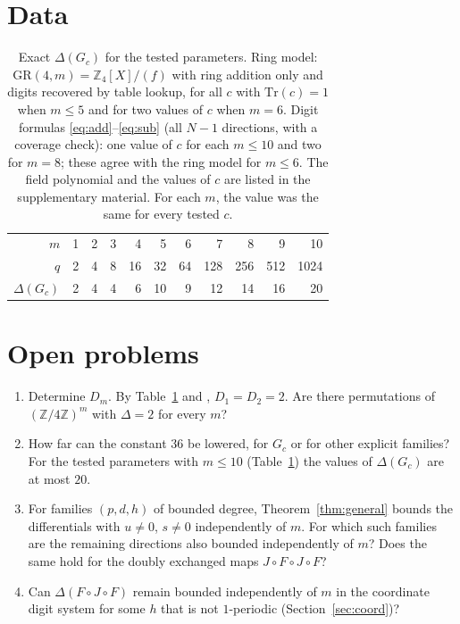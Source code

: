 \documentclass[11pt]{amsart}
\theoremstyle{definition}
\newcommand{\GR}{\mathrm{GR}}
\newcommand{\Tr}{\mathrm{Tr}}
\begin{document}
\section{Data}
\begin{table}[H]
\caption{Exact $\Delta(G_c)$ for the tested parameters. Ring model: $\GR(4,m)=\mathbb Z_4[X]/(f)$ with ring addition only and digits
recovered by table lookup, for all $c$ with $\Tr(c)=1$ when $m\le5$ and for two values of $c$ when $m=6$. Digit formulas
\eqref{eq:add}--\eqref{eq:sub} (all $N-1$ directions, with a coverage check): one value of $c$ for each $m\le10$ and two for $m=8$;
these agree with the ring model for $m\le6$. The field polynomial and the values of $c$ are listed in the supplementary material.
For each $m$, the value was the same for every tested $c$.}\label{tab:data}
\small
\begin{tabular}{rrrrrrrrrrr}
\toprule
$m$ & 1 & 2 & 3 & 4 & 5 & 6 & 7 & 8 & 9 & 10\\
$q$ & 2 & 4 & 8 & 16 & 32 & 64 & 128 & 256 & 512 & 1024\\
\midrule
$\Delta(G_c)$ & 2 & 4 & 4 & 6 & 10 & 9 & 12 & 14 & 16 & 20\\
\bottomrule
\end{tabular}
\end{table}

\section{Open problems}\label{sec:open}
\begin{enumerate}
\item Determine $D_m$. By Table~\ref{tab:data} and \cite[\S5]{RS}, $D_1=D_2=2$. Are there permutations of
$(\mathbb Z/4\mathbb Z)^m$ with $\Delta=2$ for every $m$?
\item How far can the constant $36$ be lowered, for $G_c$ or for other explicit families? For the tested parameters with
$m\le10$ (Table~\ref{tab:data}) the values of $\Delta(G_c)$ are at most $20$.
\item For families $(p,d,h)$ of bounded degree, Theorem~\ref{thm:general} bounds the differentials with $u\ne0$, $s\ne0$
independently of $m$. For which such families are the remaining directions also bounded independently of $m$? Does the same hold for the doubly exchanged maps
$J\circ F\circ J\circ F$?
\item Can $\Delta(F\circ J\circ F)$ remain bounded independently of $m$ in the coordinate digit system for some $h$ that is not
$1$-periodic (Section~\ref{sec:coord})?
\end{enumerate}
\end{document}
